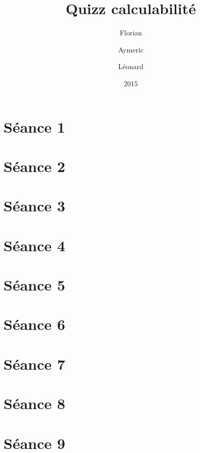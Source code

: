 \documentclass[a4paper, 12pt]{article}
\author{Florian \bsc{Thuin} \and Aymeric \bsc{De Cocq} \and Léonard \bsc{Julémont}}
\title{Quizz calculabilité}
\date{2015}
\begin{document}
\maketitle

\tableofcontents

\section{Séance 1}



\section{Séance 2}



\section{Séance 3}



\section{Séance 4}



\section{Séance 5}



\section{Séance 6}



\section{Séance 7}



\section{Séance 8}



\section{Séance 9}
\end{document}
